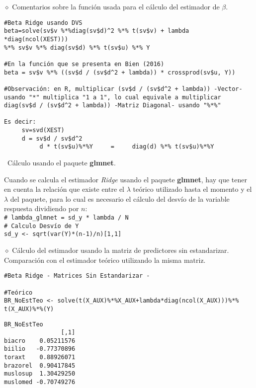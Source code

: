 \documentclass[a4paper,12pt]{report}
\begin{document}
\vspace{0.4cm}
$\diamond$ Comentarios sobre la función usada para el cálculo del estimador de $\beta$.

{
\begin{verbatim}
#Beta Ridge usando DVS
beta=solve(sv$v %*%diag(sv$d)^2 %*% t(sv$v) + lambda *diag(ncol(XEST)))
%*% sv$v %*% diag(sv$d) %*% t(sv$u) %*% Y

#En la función que se presenta en Bien (2016)
beta = sv$v %*% ((sv$d / (sv$d^2 + lambda)) * crossprod(sv$u, Y))

#Observación: en R, multiplicar (sv$d / (sv$d^2 + lambda)) -Vector- 
usando "*" multiplica "1 a 1", lo cual equivale a multiplicar 
diag(sv$d / (sv$d^2 + lambda)) -Matriz Diagonal- usando "%*%"

Es decir:
     sv=svd(XEST)
     d = sv$d / sv$d^2
          d * t(sv$u)%*%Y     =     diag(d) %*% t(sv$u)%*%Y
\end{verbatim}
}

\vspace{0.4cm}
\textbullet\ Cálculo usando el paquete \textbf{glmnet}.
\vspace{0.4cm}

Cuando se calcula el estimador \textit{Ridge} usando el paquete \textbf{glmnet}, hay que tener en cuenta la relación que existe entre el $\lambda$ teórico utilizado hasta el momento y el $\lambda$ del paquete, para lo cual es necesario el cálculo del desvío de la variable respuesta dividiendo por $n$:\\
\texttt{\# lambda\_glmnet =  sd\_y * lambda / N}\\
\texttt{\# Calculo Desvío de Y\\
sd\_y <- sqrt(var(Y)*(n-1)/n)[1,1]}

\vspace{1cm}

$\diamond$ Cálculo del estimador usando la matriz de predictores sin estandarizar. Comparación con el estimador teórico utilizando la misma matriz.

{
\begin{verbatim}
#Beta Ridge - Matrices Sin Estandarizar -

#Teórico
BR_NoEstTeo <- solve(t(X_AUX)%*%X_AUX+lambda*diag(ncol(X_AUX)))%*%
t(X_AUX)%*%(Y)
\end{verbatim}
}

{
\begin{verbatim}
BR_NoEstTeo
                [,1]
biacro    0.05211576
biilio   -0.77370896
toraxt    0.88926071
brazorel  0.90417845
muslosup  1.30429250
muslomed -0.70749276
\end{verbatim}
}
\end{document}
